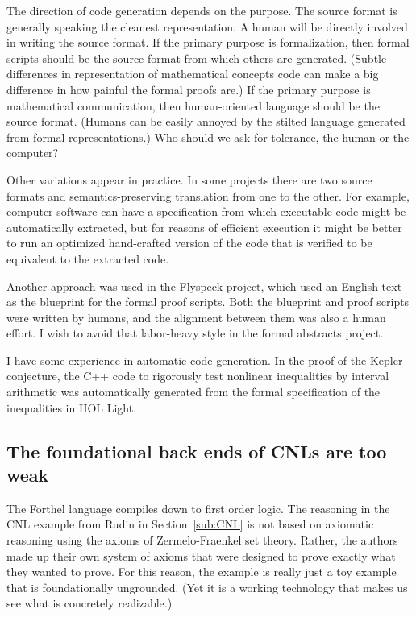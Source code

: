 \documentclass[12pt]{amsart}
\renewcommand{\~}{\ }
\renewcommand{\_}{\textunderscore}
\begin{document}
The direction of code generation depends on the purpose.  The source
format is generally speaking the cleanest representation.  A human
will be directly involved in writing the source format.  If the
primary purpose is formalization, then formal scripts should be the
source format from which others are generated.  (Subtle differences in
representation of mathematical concepts code can make a big difference
in how painful the formal proofs are.)  If the primary purpose is
mathematical communication, then human-oriented language should be the
source format.  (Humans can be easily annoyed by the stilted language
generated from formal representations.)  Who should we ask for
tolerance, the human or the computer?

Other variations appear in practice.  In some projects there are two
source formats and semantics-preserving translation from one to the
other.  For example, computer software can have a
specification from which executable code might be automatically extracted,
but for reasons of efficient execution it might be better to run an
optimized hand-crafted version of the code that is verified to be
equivalent to the extracted code.

Another approach was used in the Flyspeck project, which used an
English text as the blueprint for the formal proof scripts. Both the
blueprint and proof scripts were written by humans, and the alignment
between them was also a human effort.  I wish to avoid that
labor-heavy style in the formal abstracts project.

I have some experience in automatic code generation.  In the proof of
the Kepler conjecture, the C++ code to rigorously test nonlinear
inequalities by interval arithmetic was automatically generated from
the formal specification of the inequalities in HOL Light.

\subsection{The foundational back ends of  CNLs are too weak}

The Forthel language compiles down to first order logic.  The
reasoning in the CNL example from Rudin in Section~\ref{sub:CNL} is
not based on axiomatic reasoning using the axioms of Zermelo-Fraenkel
set theory.  Rather, the authors made up their own system of axioms
that were designed to prove exactly what they wanted to prove. For
this reason, the example is really just a toy example that is
foundationally ungrounded.  (Yet it is a working technology
that makes us see what is concretely realizable.)
\end{document}
